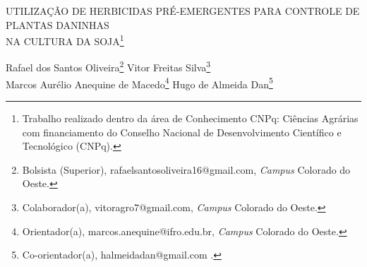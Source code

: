 \documentclass[article,12pt,onesidea,4paper,english,brazil]{abntex2}
\begin{document}
	
	
	\frenchspacing 
	
	\begin{center}
		\LARGE UTILIZAÇÃO DE HERBICIDAS PRÉ-EMERGENTES PARA CONTROLE DE
		PLANTAS DANINHAS\\NA CULTURA DA SOJA\footnote{Trabalho realizado dentro da área de Conhecimento CNPq: Ciências Agrárias com financiamento do Conselho Nacional de Desenvolvimento Científico e Tecnológico (CNPq).}
		
		\normalsize
		Rafael dos Santos Oliveira\footnote{Bolsista (Superior), rafaelsantosoliveira16@gmail.com, \textit{Campus} Colorado do Oeste.} 
		Vitor Freitas Silva\footnote{Colaborador(a), vitoragro7@gmail.com, \textit{Campus} Colorado do Oeste.} \\
		Marcos Aurélio Anequine de Macedo\footnote{Orientador(a), marcos.anequine@ifro.edu.br, \textit{Campus} Colorado do Oeste.} 
		Hugo de Almeida Dan\footnote{Co-orientador(a), halmeidadan@gmail.com .} 
	\end{center}
	
\end{document}
